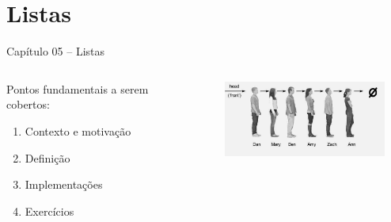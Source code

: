
\section{Listas}

\begin{frame}

\begin{center}
{\Large Capítulo 05 -- Listas}
\end{center}

\begin{columns}
\begin{column}{.5\textwidth}
\centering
Pontos fundamentais a serem cobertos:
  \begin{enumerate}
  \item Contexto e motivação
  \item Definição
  \item Implementações
  \item Exercícios 
\end{enumerate}  

\end{column}
\begin{column}{.5\textwidth}
\centering
\includegraphics[height=2.5cm, width=7cm]{figs/fig_listas/ilustra_lista.jpg}
\end{column}
\end{columns}


\end{frame}

